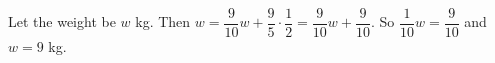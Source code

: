 Let the weight be $w$ kg. Then $w=\dfrac9{10}w+\dfrac95\cdot\dfrac12=\dfrac9{10}w+\dfrac9{10}$. So $\dfrac1{10}w=\dfrac9{10}$ and $w=\boxed{9}$ kg.

